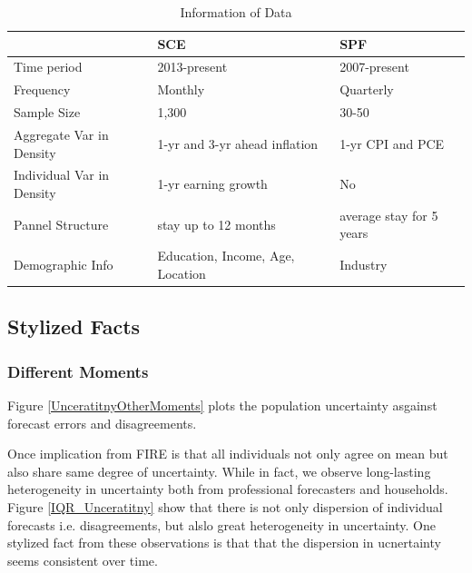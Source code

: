 \documentclass[]{article}
\begin{document}
\begin{table}[]
			\caption{Information of Data}
	\begin{tabular}{lll}

		\hline 
		& SCE & SPF        \\
		\hline 
		Time period                                    & 2013-present                            & 2007-present             \\
		Frequency                                      & Monthly                                 & Quarterly                \\
		Sample Size                                    & 1,300                                   & 30-50                    \\
		Aggregate Var in Density                       & 1-yr  and 3-yr ahead inflation          & 1-yr CPI and PCE         \\
		Individual Var in Density                      & 1-yr earning growth                     & No                       \\
		Pannel Structure                               & stay up to 12 months                    & average stay for 5 years \\
		Demographic Info                        & Education, Income, Age, Location        & Industry    \\
		\hline 
	\end{tabular}
\end{table}


\subsection{Stylized Facts}

\subsubsection{Different Moments}

Figure \ref{UnceratitnyOtherMoments} plots the population uncertainty asgainst forecast errors and disagreements. 

Once implication from FIRE is that all individuals not only agree on mean but also share same degree of uncertainty. While in fact, we observe long-lasting heterogeneity in uncertainty both from professional forecasters and households. Figure \ref{IQR_Unceratitny} show that there is  not only dispersion of individual forecasts i.e. disagreements, but alslo great heterogeneity in uncertainty. One stylized fact from these observations is that that the dispersion in ucnertainty seems consistent over time.   
\end{document}
